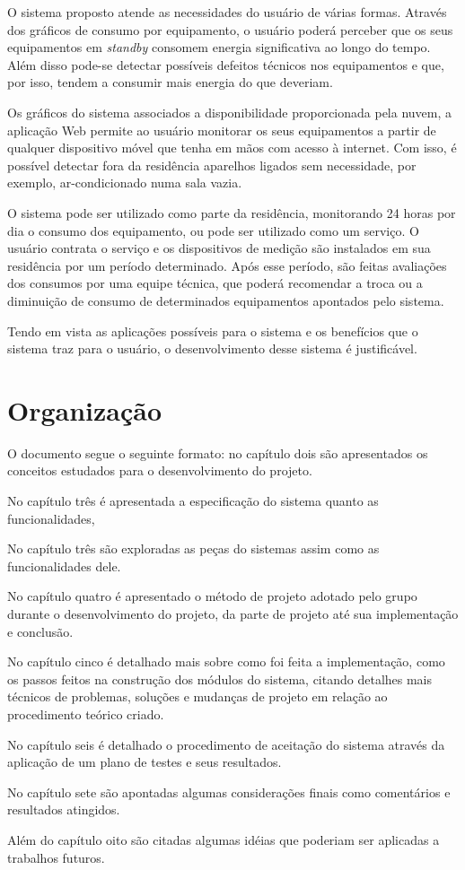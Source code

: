 O sistema proposto atende as necessidades do usuário de várias formas. Através dos gráficos de consumo por equipamento, o usuário poderá perceber que os seus equipamentos em \textit{standby} consomem energia significativa ao longo do tempo. Além disso pode-se detectar possíveis defeitos técnicos nos equipamentos e que, por isso, tendem a consumir mais energia do que deveriam.

Os gráficos do sistema associados a disponibilidade proporcionada pela nuvem, a aplicação Web permite ao usuário monitorar os seus equipamentos a partir de qualquer dispositivo móvel que tenha em mãos com acesso à internet. Com isso, é possível detectar fora da residência aparelhos ligados sem necessidade, por exemplo, ar-condicionado numa sala vazia.

O sistema pode ser utilizado como parte da residência, monitorando 24 horas por dia o consumo dos equipamento, ou pode ser utilizado como um serviço. O usuário contrata o serviço e os dispositivos de medição são instalados em sua residência por um período determinado. Após esse período, são feitas avaliações dos consumos por uma equipe técnica, que poderá recomendar a troca ou a diminuição de consumo de determinados equipamentos apontados pelo sistema.

Tendo em vista as aplicações possíveis para o sistema e os benefícios que o sistema traz para o usuário, o desenvolvimento desse sistema é justificável.

\section{Organização}
\label{Sec:organizacao}

O documento segue o seguinte formato: no capítulo dois são apresentados os conceitos estudados para o desenvolvimento do projeto.

No capítulo três é apresentada a especificação do sistema quanto as funcionalidades, 

No capítulo três são exploradas as peças do sistemas assim como as funcionalidades dele.

No capítulo quatro é apresentado o método de projeto adotado pelo grupo durante o desenvolvimento do projeto, da parte de projeto até sua implementação e conclusão.

No capítulo cinco é detalhado mais sobre como foi feita a implementação, como os passos feitos na construção dos módulos do sistema, citando detalhes mais técnicos de problemas, soluções e mudanças de projeto em relação ao procedimento teórico criado.

No capítulo seis é detalhado o procedimento de aceitação do sistema através da aplicação de um plano de testes e seus resultados.

No capítulo sete são apontadas algumas considerações finais como comentários e resultados atingidos.

Além do capítulo oito são citadas algumas idéias que poderiam ser aplicadas a trabalhos futuros.
